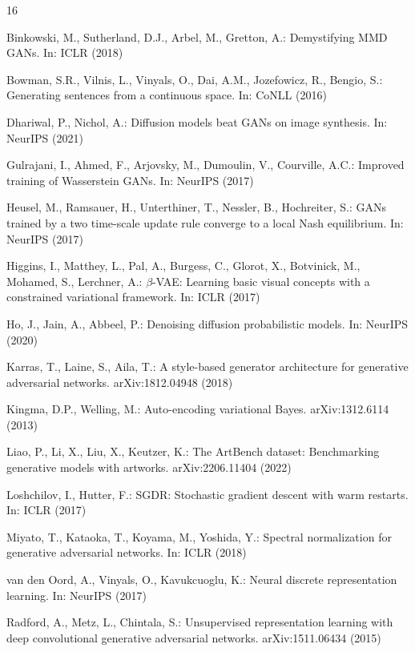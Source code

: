 \documentclass[runningheads]{llncs}
\begin{document}
\begin{thebibliography}{16}

Binkowski, M., Sutherland, D.J., Arbel, M., Gretton, A.:
Demystifying MMD GANs. In: ICLR (2018)

Bowman, S.R., Vilnis, L., Vinyals, O., Dai, A.M., Jozefowicz, R., Bengio, S.:
Generating sentences from a continuous space. In: CoNLL (2016)

Dhariwal, P., Nichol, A.: Diffusion models beat GANs on image synthesis.
In: NeurIPS (2021)

Gulrajani, I., Ahmed, F., Arjovsky, M., Dumoulin, V., Courville, A.C.:
Improved training of Wasserstein GANs. In: NeurIPS (2017)

Heusel, M., Ramsauer, H., Unterthiner, T., Nessler, B., Hochreiter, S.:
GANs trained by a two time-scale update rule converge to a local Nash equilibrium.
In: NeurIPS (2017)

Higgins, I., Matthey, L., Pal, A., Burgess, C., Glorot, X., Botvinick, M.,
Mohamed, S., Lerchner, A.:
$\beta$-VAE: Learning basic visual concepts with a constrained variational
framework. In: ICLR (2017)

Ho, J., Jain, A., Abbeel, P.: Denoising diffusion probabilistic models.
In: NeurIPS (2020)

Karras, T., Laine, S., Aila, T.: A style-based generator architecture for
generative adversarial networks. arXiv:1812.04948 (2018)

Kingma, D.P., Welling, M.: Auto-encoding variational Bayes.
arXiv:1312.6114 (2013)

Liao, P., Li, X., Liu, X., Keutzer, K.: The ArtBench dataset: Benchmarking
generative models with artworks. arXiv:2206.11404 (2022)

Loshchilov, I., Hutter, F.: SGDR: Stochastic gradient descent with warm
restarts. In: ICLR (2017)

Miyato, T., Kataoka, T., Koyama, M., Yoshida, Y.:
Spectral normalization for generative adversarial networks. In: ICLR (2018)

van den Oord, A., Vinyals, O., Kavukcuoglu, K.:
Neural discrete representation learning. In: NeurIPS (2017)

Radford, A., Metz, L., Chintala, S.: Unsupervised representation learning
with deep convolutional generative adversarial networks. arXiv:1511.06434 (2015)


\end{thebibliography}
\end{document}
